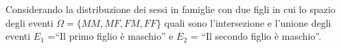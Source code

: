 \begin{esercizio}
 \label{ese:9.5}
 Considerando la distribuzione dei sessi in famiglie con due figli in cui lo 
spazio degli eventi $\Omega =\{{MM}, {MF}, {FM}, {FF}\}$ quali sono 
l'intersezione e l'unione degli eventi $E_1$ =``Il primo figlio è maschio'' e 
$E_2$ = ``Il secondo figlio è maschio''.
\end{esercizio}

\subsubsection*{}

% 
% 
% 
% 
% 

